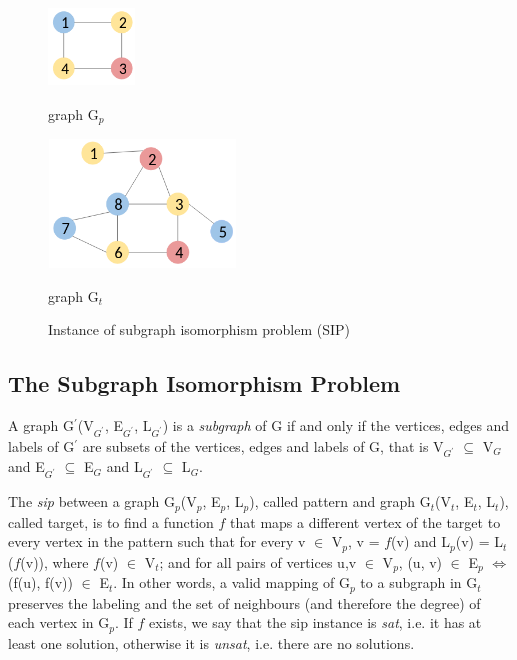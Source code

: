 \documentclass{l4proj}
\newcounter{example}[section]
\begin{document}
\begin{figure}[H]
\centering
\begin{minipage}[t]{.4\textwidth}
  \centering
  \includegraphics[height=2.1cm,width=2.3cm]{images/graphs/exampleGraph2.png}
  \caption{graph G$_{p}$}
  \label{fig:exampleGraph2}
\end{minipage}%
\begin{minipage}[t]{.6\textwidth}
  \centering
  \includegraphics[height=3.4cm,width=5cm]{images/graphs/exampleGraph.png}
  \caption{graph G$_{t}$}
  \label{fig:exampleGraph}
\end{minipage}%
\caption{Instance of subgraph isomorphism problem (SIP)}
\label{fig:SIP}
\end{figure}

\subsection{The Subgraph Isomorphism Problem}

A graph G$^{\prime}$(V$_{G^{\prime}}$, E$_{G^{\prime}}$, L$_{G^{\prime}}$) is a \textit{subgraph} of G if and only if the vertices, edges and labels of G$^{\prime}$ are subsets of the vertices, edges and labels of G, that is V$_{G^{\prime}}$ $\subseteq$ V$_{G}$ and E$_{G^{\prime}}$ $\subseteq$ E$_{G}$ and L$_{G^{\prime}}$ $\subseteq$ L$_{G}$.

The \emph{\gls{sip}} between a graph G$_{p}$(V$_{p}$, E$_{p}$, L$_{p}$), called pattern and graph G$_{t}$(V$_{t}$, E$_{t}$, L$_{t}$), called target, is to find a function $f$ that maps a different vertex of the target to every vertex in the pattern such that for every v $\in$ V$_{p}$, v = $f$(v) and L$_{p}$(v) = L$_{t}$($f$(v)), where $f$(v) $\in$ V$_{t}$; and for all pairs of vertices u,v $\in$ V$_{p}$, (u, v) $\in$ E$_{p}$ $\Leftrightarrow$ (f(u), f(v)) $\in$ E$_{t}$. In other words, a valid mapping of G$_{p}$ to a subgraph in G$_{t}$ preserves the labeling and the set of neighbours (and therefore the degree) of each vertex in G$_{p}$. If $f$ exists, we say that the \gls{sip} instance is \emph{\gls{sat}}, i.e. it has at least one solution, otherwise it is \emph{\gls{unsat}}, i.e. there are no solutions.
\end{document}
